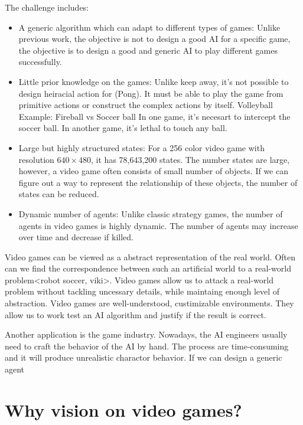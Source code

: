 The challenge includes:
\begin{itemize}{}

\item A generic algorithm which can adapt to different types of games:
Unlike previous work, the objective is not to design a good AI for a specific game, the objective is
to design a good and generic AI to play different games successfully.

\item Little prior knowledge on the games: Unlike keep away, it's not possible to design heiracial action
for (Pong). It must be able to play the game from primitive actions or construct the complex actions by itself.
Volleyball
Example: 
  Fireball vs Soccer ball
  In one game, it's necesart to intercept the soccer ball.
  In another game, it's lethal to touch any ball.

\item Large but highly structured states:
For a 256 color video game with resolution $640 \times 480$, it has 78,643,200 states.
The number states are large, however, a video game often consists of small number of objects.
If we can figure out a way to represent the relationship of these objects, the number of states
can be reduced.

\item Dynamic number of agents:
Unlike classic strategy games, the number of agents in video games is highly dynamic.
The number of agents may increase over time and decrease if killed.

\end{itemize}

Video games can be viewed as a abstract representation of the real world. Often can we find the 
correspondence between such an artificial world to a real-world problem<robot soccer, viki>.
Video games allow us to attack a real-world problem without tackling uncessary details, while maintaing enough 
level of abstraction.
Video games are well-understood, custimizable environments. They allow us to work test an AI algorithm
and justify if the result is correct. \cite{Yavar}

Another application is the game industry.
Nowadays, the AI engineers usually need to craft the behavior of the AI by hand. 
The process are time-consuming and it will produce unrealistic charactor behavior.
If we can design a generic agent 

\section{Why vision on video games?}

